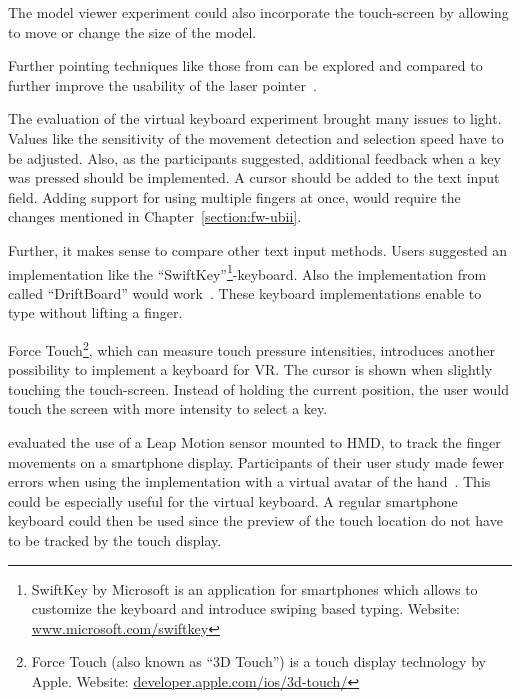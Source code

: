 The model viewer experiment could also incorporate the touch-screen by allowing to move or change the size of the model.

Further pointing techniques like those from \citeauthor{Argelaguet.2013} can be explored and compared to further improve the usability of the laser pointer~\cite[123]{Argelaguet.2013}.

The evaluation of the virtual keyboard experiment brought many issues to light. 
Values like the sensitivity of the movement detection and selection speed have to be adjusted. Also, as the participants suggested, additional feedback when a key was pressed should be implemented. A cursor should be added to the text input field. Adding support for using multiple fingers at once, would require the changes mentioned in Chapter~\ref{section:fw-ubii}.

Further, it makes sense to compare other text input methods. Users suggested an implementation like the \enquote{SwiftKey}\footnote{SwiftKey by Microsoft is an application for smartphones which allows to customize the keyboard and introduce swiping based typing. Website: \href{https://www.microsoft.com/swiftkey}{www.microsoft.com/swiftkey}}-keyboard. Also the implementation from \citeauthor{Shibata.2016} called \enquote{DriftBoard} would work~\cite{Shibata.2016}. These keyboard implementations enable to type without lifting a finger. 

Force Touch\footnote{Force Touch (also known as \enquote{3D Touch}) is a touch display technology by Apple. Website: \href{https://developer.apple.com/ios/3d-touch/}{developer.apple.com/ios/3d-touch/}}, which can measure touch pressure intensities, introduces another possibility to implement a keyboard for \gls{VR}. The cursor is shown when slightly touching the touch-screen. Instead of holding the current position, the user would touch the screen with more intensity to select a key. 

\citeauthor{Afonso.2017} evaluated the use of a Leap Motion sensor mounted to \gls{HMD}, to track the finger movements on a smartphone display. Participants of their user study made fewer errors when using the implementation with a virtual avatar of the hand~\cite[247\psq]{Afonso.2017}. This could be especially useful for the virtual keyboard. A regular smartphone keyboard could then be used since the preview of the touch location do not have to be tracked by the touch display.

